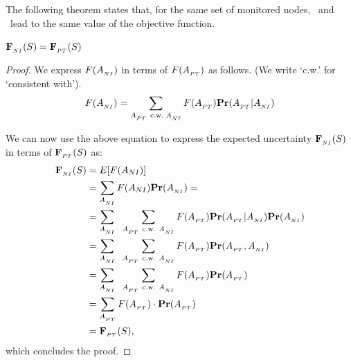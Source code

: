 \subsection{}
The following theorem states that, for the same set of monitored nodes,
\parentstransitions\ and \nodeitems\ lead to the same value of the objective 
function.
\begin{theorem}
\label{theorem:node-equivalence}
$\mathbf{F}_{_{\sc NI}}(S) = \mathbf{F}_{_{\sc PT}}(S)$
\begin{proof}
We express $F(A_{_{\sc NI}})$ in terms
of $F(A_{_{\sc PT}})$ as follows.
(We write `c.w.' for `consistent with').
\begin{align}
F(A_{_{\sc NI}})
 = \sum_{A_{_{\sc PT}}
  \ \text{c.w.}\; A_{_{\sc NI}}
  } F(A_{_{\sc PT}})
  \mathbf{Pr}(A_{_{\sc PT}} | A_{_{\sc NI}})
\end{align}


We can now use the above equation to
express the expected uncertainty $\mathbf{F}_{_{\sc NI}}(S)$
in terms of $\mathbf{F}_{_{\sc PT}}(S)$ as:
\begin{align}
\mathbf{F}_{_{\sc NI}}(S) & =  E[F(A_{{\sc NI}})] \nonumber \\
& = \sum_{A_{_{\sc NI}}}F(A_{{\sc NI}}) \mathbf{Pr}(A_{_{\sc NI}}) = \nonumber \\
& = \sum_{A_{_{\sc NI}}}\;\;\sum_{A_{_{\sc PT}}
  \ \text{c.w.}\ A_{_{\sc NI}}
  } F(A_{_{\sc PT}})
  \mathbf{Pr}(A_{_{\sc PT}} | A_{_{\sc NI}}) \mathbf{Pr}(A_{_{\sc NI}}) \nonumber \\
& = \sum_{A_{_{\sc NI}}}\;\;\sum_{A_{_{\sc PT}}
  \ \text{c.w.}\ A_{_{\sc NI}}
  } F(A_{_{\sc PT}})
  \mathbf{Pr}(A_{_{\sc PT}}, A_{_{\sc NI}}) \nonumber \\
& = \sum_{A_{_{\sc NI}}}\;\;\sum_{A_{_{\sc PT}}
  \ \text{c.w.}\ A_{_{\sc NI}}
  } F(A_{_{\sc PT}})
  \mathbf{Pr}(A_{_{\sc PT}}) \nonumber \\
& = \sum_{A_{_{\sc PT}}} 
  F(A_{_{\sc PT}})
  \cdot \mathbf{Pr}(A_{_{\sc PT}}) \nonumber \\
& = \mathbf{F}_{_{\sc PT}}(S),
\end{align}
which concludes the proof.
\end{proof}
\end{theorem}


